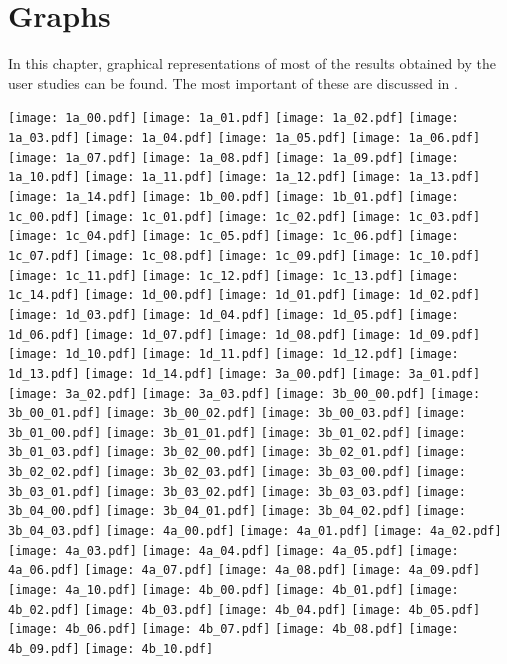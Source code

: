 \chapter{Graphs}
\vspace{-.4cm}
In this chapter, graphical representations of most of the results obtained by the user studies can be found. The most important of these are discussed in .
\vspace{-.6cm}

\graphicspath{ {C:/Users/Jimi/Dropbox/MasterProject/results/graphs/} }
\begin{center}
\texttt{[image: 1a\_00.pdf]}
\texttt{[image: 1a\_01.pdf]}
\texttt{[image: 1a\_02.pdf]}
\texttt{[image: 1a\_03.pdf]}
\texttt{[image: 1a\_04.pdf]}
\texttt{[image: 1a\_05.pdf]}
\texttt{[image: 1a\_06.pdf]}
\texttt{[image: 1a\_07.pdf]}
\texttt{[image: 1a\_08.pdf]}
\texttt{[image: 1a\_09.pdf]}
\texttt{[image: 1a\_10.pdf]}
\texttt{[image: 1a\_11.pdf]}
\texttt{[image: 1a\_12.pdf]}
\texttt{[image: 1a\_13.pdf]}
\texttt{[image: 1a\_14.pdf]}
\texttt{[image: 1b\_00.pdf]}
\texttt{[image: 1b\_01.pdf]}
\texttt{[image: 1c\_00.pdf]}
\texttt{[image: 1c\_01.pdf]}
\texttt{[image: 1c\_02.pdf]}
\texttt{[image: 1c\_03.pdf]}
\texttt{[image: 1c\_04.pdf]}
\texttt{[image: 1c\_05.pdf]}
\texttt{[image: 1c\_06.pdf]}
\texttt{[image: 1c\_07.pdf]}
\texttt{[image: 1c\_08.pdf]}
\texttt{[image: 1c\_09.pdf]}
\texttt{[image: 1c\_10.pdf]}
\texttt{[image: 1c\_11.pdf]}
\texttt{[image: 1c\_12.pdf]}
\texttt{[image: 1c\_13.pdf]}
\texttt{[image: 1c\_14.pdf]}
\texttt{[image: 1d\_00.pdf]}
\texttt{[image: 1d\_01.pdf]}
\texttt{[image: 1d\_02.pdf]}
\texttt{[image: 1d\_03.pdf]}
\texttt{[image: 1d\_04.pdf]}
\texttt{[image: 1d\_05.pdf]}
\texttt{[image: 1d\_06.pdf]}
\texttt{[image: 1d\_07.pdf]}
\texttt{[image: 1d\_08.pdf]}
\texttt{[image: 1d\_09.pdf]}
\texttt{[image: 1d\_10.pdf]}
\texttt{[image: 1d\_11.pdf]}
\texttt{[image: 1d\_12.pdf]}
\texttt{[image: 1d\_13.pdf]}
\texttt{[image: 1d\_14.pdf]}
\texttt{[image: 3a\_00.pdf]}
\texttt{[image: 3a\_01.pdf]}
\texttt{[image: 3a\_02.pdf]}
\texttt{[image: 3a\_03.pdf]}
\texttt{[image: 3b\_00\_00.pdf]}
\texttt{[image: 3b\_00\_01.pdf]}
\texttt{[image: 3b\_00\_02.pdf]}
\texttt{[image: 3b\_00\_03.pdf]}
\texttt{[image: 3b\_01\_00.pdf]}
\texttt{[image: 3b\_01\_01.pdf]}
\texttt{[image: 3b\_01\_02.pdf]}
\texttt{[image: 3b\_01\_03.pdf]}
\texttt{[image: 3b\_02\_00.pdf]}
\texttt{[image: 3b\_02\_01.pdf]}
\texttt{[image: 3b\_02\_02.pdf]}
\texttt{[image: 3b\_02\_03.pdf]}
\texttt{[image: 3b\_03\_00.pdf]}
\texttt{[image: 3b\_03\_01.pdf]}
\texttt{[image: 3b\_03\_02.pdf]}
\texttt{[image: 3b\_03\_03.pdf]}
\texttt{[image: 3b\_04\_00.pdf]}
\texttt{[image: 3b\_04\_01.pdf]}
\texttt{[image: 3b\_04\_02.pdf]}
\texttt{[image: 3b\_04\_03.pdf]}
\texttt{[image: 4a\_00.pdf]}
\texttt{[image: 4a\_01.pdf]}
\texttt{[image: 4a\_02.pdf]}
\texttt{[image: 4a\_03.pdf]}
\texttt{[image: 4a\_04.pdf]}
\texttt{[image: 4a\_05.pdf]}
\texttt{[image: 4a\_06.pdf]}
\texttt{[image: 4a\_07.pdf]}
\texttt{[image: 4a\_08.pdf]}
\texttt{[image: 4a\_09.pdf]}
\texttt{[image: 4a\_10.pdf]}
\texttt{[image: 4b\_00.pdf]}
\texttt{[image: 4b\_01.pdf]}
\texttt{[image: 4b\_02.pdf]}
\texttt{[image: 4b\_03.pdf]}
\texttt{[image: 4b\_04.pdf]}
\texttt{[image: 4b\_05.pdf]}
\texttt{[image: 4b\_06.pdf]}
\texttt{[image: 4b\_07.pdf]}
\texttt{[image: 4b\_08.pdf]}
\texttt{[image: 4b\_09.pdf]}
\texttt{[image: 4b\_10.pdf]}
\end{center}
